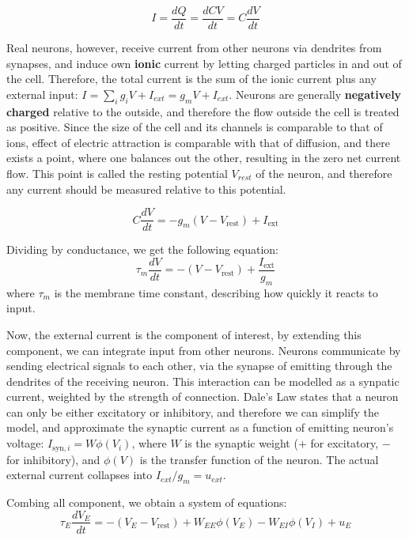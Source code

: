 \documentclass[10pt,twocolumn]{article}
\begin{document}
$$
    I = \frac{dQ}{dt} = \frac{dCV}{dt} = C \frac{dV}{dt}
$$

Real neurons, however, receive current from other neurons via dendrites from synapses,
and induce own \textbf{ionic} current by
letting charged particles
in and out of the cell. Therefore,
the total current is the sum of the ionic current plus any external input: $I = \sum_{i}g_iV + I_{ext} = g_mV + I_{ext}$.
Neurons are generally \textbf{negatively charged} relative to the outside, and therefore the flow outside the cell is treated as positive.
Since the size of the cell and its channels is comparable to that of ions, effect of electric attraction is comparable with that of diffusion,
and there exists a point, where one balances out the other, resulting in the zero net current flow.
This point is called the resting potential $V_{rest}$ of the neuron, and therefore any current should be measured relative to this potential.

$$
    C \frac{dV}{dt} = -g_m(V - V_{\text{rest}}) + I_{\text{ext}}
$$

Dividing by conductance, we get the following equation:
$$
    \tau_m \frac{dV}{dt} = -(V - V_{\text{rest}}) + \frac{I_{\text{ext}}}{g_m}
$$
where $\tau_m$ is the membrane time constant, describing how quickly it reacts to input.

Now, the external current is the component of interest,
by extending this component, we can integrate input from other neurons.
Neurons communicate by sending electrical signals to each other, via the synapse of
emitting through the dendrites of the receiving neuron.
This interaction can be modelled as a synpatic current, weighted by the strength of connection.
Dale's Law\cite{efron1968psychopharmacology} states that a neuron can only be
either excitatory or inhibitory, and therefore we can simplify the model, and
approximate the synaptic current as a function of emitting neuron's voltage:
$I_{\text{syn},i} = W\phi(V_i)$,
where $W$ is the synaptic weight ($+$ for excitatory, $-$ for inhibitory), and $\phi(V)$ is the transfer function of the neuron.
The actual external current collapses into $I_{ext}/g_m=u_{ext}$.

Combing all component, we obtain a system of equations:
\begin{equation}
    \tau_E \frac{dV_E}{dt} =
    -(V_E - V_{\text{rest}})
    + W_{EE} \phi(V_E)
    - W_{EI} \phi(V_I) + u_E
\end{equation}
\end{document}
